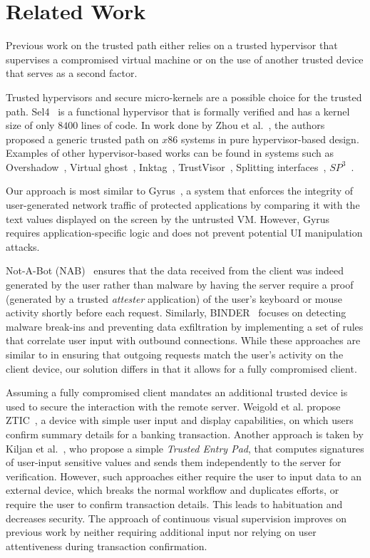 \section{Related Work} 
\label{integriscreen:sec:relatedWork}

Previous work on the trusted path either relies on a trusted hypervisor that supervises a compromised virtual machine or on the use of another trusted device that serves as a second factor.

Trusted hypervisors and secure micro-kernels are a possible choice for the trusted path. Sel4~\cite{klein2009sel4} is a functional hypervisor that is formally verified and has a kernel size of only $8400$ lines of code. In work done by Zhou et al.~\cite{x86}, the authors proposed a generic trusted path on $x86$ systems in pure hypervisor-based design. Examples of other hypervisor-based works can be found in systems such as Overshadow~\cite{Overshadow}, Virtual ghost~\cite{criswell2014virtual}, Inktag~\cite{hofmann2013inktag}, TrustVisor~\cite{mccune2010trustvisor}, Splitting interfaces~\cite{ta2006splitting}, $SP^3$~\cite{yang2008using}.

Our approach is most similar to Gyrus~\cite{gyrus}, a system that enforces the integrity of user-generated network traffic of protected applications by comparing it with the text values displayed on the screen by the untrusted VM. However, Gyrus requires application-specific logic and does not prevent potential UI manipulation attacks.

Not-A-Bot (NAB)~\cite{nab} ensures that the data received from the client was indeed generated by the user rather than malware by having the server require a proof (generated by a trusted \emph{attester} application) of the user's keyboard or mouse activity shortly before each request.
Similarly, BINDER~\cite{binder} focuses on detecting malware break-ins and preventing data exfiltration by implementing a set of rules that correlate user input with outbound connections. While these approaches are similar to \sysname in ensuring that outgoing requests match the user's activity on the client device, our solution differs in that it allows for a fully compromised client.


Assuming a fully compromised client mandates an additional trusted device is used to secure the interaction with the remote server.
Weigold et al. propose ZTIC~\cite{weigold2011}, a device with simple user input and display capabilities, on which users confirm summary details for a banking transaction. Another approach is taken by Kiljan et al.~\cite{6978928}, who propose a simple \emph{Trusted Entry Pad}, that computes signatures of user-input sensitive values and sends them independently to the server for verification. However, such approaches either require the user to input data to an external device, which breaks the normal workflow and duplicates efforts, or require the user to confirm transaction details. This leads to habituation and decreases security. The approach of continuous visual supervision improves on previous work by neither requiring additional input nor relying on user attentiveness during transaction confirmation.